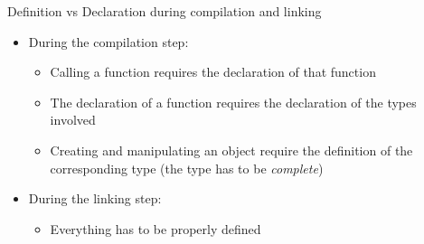 \begin{frame}{Definition vs Declaration during compilation and linking}

  \begin{itemize}[<+->]
  \item During the compilation step:
  \begin{itemize}
  \item Calling a function requires the declaration of that function
  \item The declaration of a function requires the declaration of the types
    involved
  \item Creating and manipulating an object require the definition of the
    corresponding type (the type has to be \textit{complete})
  \end{itemize}

\item During the linking step:

  \begin{itemize}
  \item Everything has to be properly defined
  \end{itemize}
    \end{itemize}

\end{frame}

